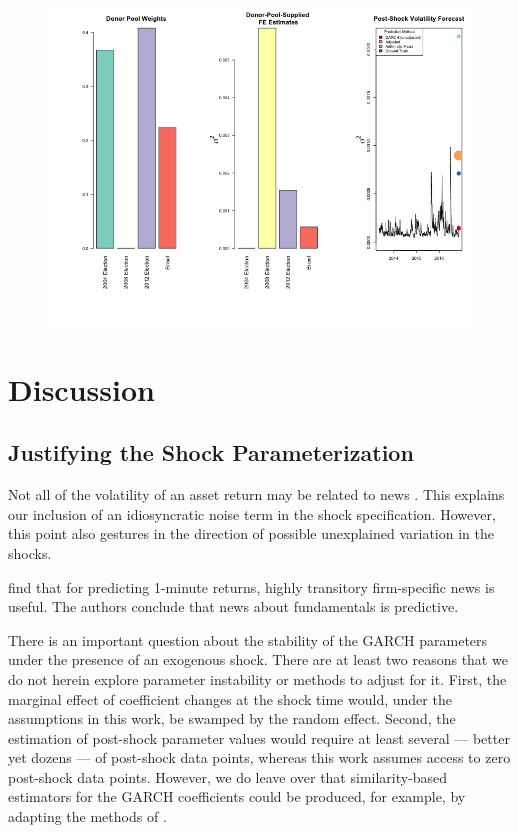 \documentclass[11pt]{article}
\theoremstyle{definition}
\begin{document}
\begin{figure}[H]
\begin{center}
  \includegraphics[scale=.6]{real_data_output_plots/savetime_SunMar172251232024_IYG_6B=F-CL=F-^VIX-^IRX-^FVX-^TNX-^TYX_^VIX_2016-11-08-2004-11-02-2008-11-04-2012-11-06-2016-06-22.png}
  \label{fig:SVF_2016_without_Brexit}
  \end{center}
\end{figure}


\section{Discussion}

\subsection{Justifying the Shock Parameterization}
 
    Not all of the volatility of an asset return may be related to news \citep{boudoukh2019information}.  This explains our inclusion of an idiosyncratic noise term in the shock specification.  However, this point also gestures in the direction of possible unexplained variation in the shocks.
    
    \citet{chinco2019sparse} find that for predicting 1-minute returns, highly transitory firm-specific news is useful.  The authors conclude that news about fundamentals is predictive.

    There is an important question about the stability of the GARCH parameters under the presence of an exogenous shock.  There are at least two reasons that we do not herein explore parameter instability or methods to adjust for it.  First, the marginal effect of coefficient changes at the shock time would, under the assumptions in this work, be swamped by the random effect.  Second, the estimation of post-shock parameter values would require at least several --- better yet dozens --- of post-shock data points, whereas this work assumes access to zero post-shock data points.  However, we do leave over that similarity-based estimators for the GARCH coefficients could be produced, for example, by adapting the methods of \citet{dendramis2020similarity}.
\end{document}
